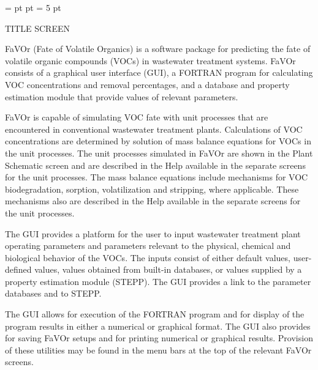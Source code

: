 \hfuzz=1pt                  %
\magnification=    %
 pt         %
 pt             %
\parskip= 5 pt



\newpage

TITLE SCREEN

FaVOr (Fate of Volatile Organics) is a software package for predicting the fate of volatile organic compounds (VOCs) in wastewater treatment systems.  FaVOr consists of a graphical user interface (GUI), a FORTRAN program for calculating VOC concentrations and removal percentages, and a database and property estimation module that provide values of relevant parameters.  

FaVOr is capable of simulating VOC fate with unit processes that are
encountered in conventional wastewater treatment plants.  Calculations of VOC
concentrations are determined by solution of mass balance equations for VOCs in
the unit processes.  The unit processes simulated in FaVOr are shown in the
Plant Schematic screen and are described in the Help available in the separate
screens for the unit processes.  The mass balance equations include mechanisms
for VOC biodegradation, sorption, volatilization and stripping, where
applicable. These mechanisms also are described in the Help available in the
separate screens for the unit processes.

The GUI provides a platform for the user to input wastewater treatment plant
operating parameters and parameters relevant to  the physical, chemical and
biological behavior of the VOCs.  The inputs consist of either default values,
user-defined values, values obtained from built-in databases, or values
supplied by a property estimation module (STEPP). The GUI provides a link to
the parameter databases and to STEPP.  

The GUI allows for execution of the FORTRAN program and for display of the
program results in either a numerical or graphical format.  The GUI also
provides for saving FaVOr setups and for printing numerical or graphical
results.  Provision of these utilities may be found in the menu bars at the top
of the relevant FaVOr screens. 




\newpage

